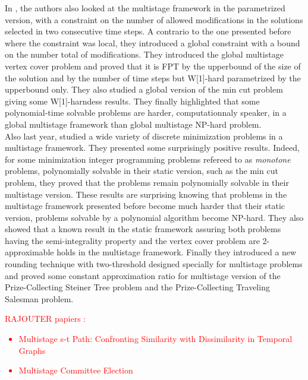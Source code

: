 \documentclass[a4paper]{book}
\newcommand{\alex}[2]{\textcolor{red}{#1}}
\begin{document}
In \cite{heeger2019multistage}, the authors also looked at the multistage framework in the parametrized version, with a constraint on the number of allowed modifications in the solutions selected in two consecutive time steps. A contrario to the one presented before where the constraint was local, they introduced a global constraint with a bound on the number total of modifications. They introduced the {\sc global multistage vertex cover} problem and proved that it is FPT by the upperbound of the size of the solution and by the number of time steps but W[1]-hard parametrized by the upperbound only. They also studied a global version of the {\sc min cut} problem giving some W[1]-harndess results. They finally highlighted that some polynomial-time solvable problems are harder, computationnaly speaker, in a global multistage framework than global multistage NP-hard problem. \\

Also last year, \cite{bampis2019lp} studied a wide variety of discrete minimization problems in a multistage framework. They presented some surprisingly positive results. Indeed, for some minimization integer programming problems refereed to as \textit{monotone} problems, polynomially solvable in their static version, such as the {\sc min cut} problem, they proved that the problems remain polynomially solvable in their multistage version. These results are surprising knowing that problems in the multistage framework presented before become much harder that their static version, problems solvable by a polynomial algorithm become NP-hard. They also showed that a known result in the static framework assuring both problems having the semi-integrality property and the {\sc vertex cover} problem are 2-approximable holds in the multistage framework. Finally they introduced a new rounding technique with two-threshold designed specially for multistage problems and proved some constant approximation ratio for multistage version of the {\sc Prize-Collecting Steiner Tree} problem and the {\sc Prize-Collecting Traveling Salesman} problem. \\

\alex{RAJOUTER papiers :
\begin{itemize}
    \item Multistage s-t Path: Confronting Similarity with Dissimilarity in Temporal Graphs
    \item Multistage Committee Election
\end{itemize}}\\
\end{document}
